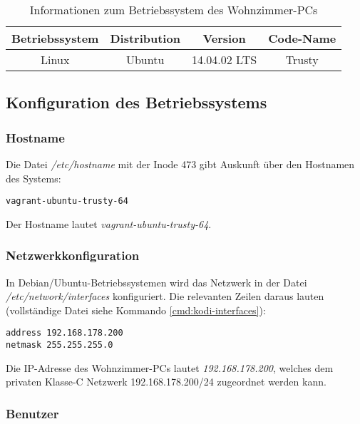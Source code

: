 \begin{table}[H]
\centering
\begin{tabular}{cccc}
\hline 
Betriebssystem & Distribution & Version & Code-Name \\ 
\hline 
Linux & Ubuntu & 14.04.02 LTS & Trusty \\ 
\hline 
\end{tabular} 
\caption{Informationen zum Betriebssystem des Wohnzimmer-PCs}
\label{table:kodi-os}
\end{table}

\subsection{Konfiguration des Betriebssystems}

\subsubsection{Hostname}
\label{sec:kodi-hostname}

Die Datei \textit{/etc/hostname} mit der Inode 473 gibt Auskunft über den Hostnamen des Systems:

\begin{cmd}
\begin{verbatim}
vagrant-ubuntu-trusty-64
\end{verbatim}
\caption{icat -o 2048 kodi.raw 473}
\end{cmd}

Der Hostname lautet \textit{vagrant-ubuntu-trusty-64}.

\subsubsection{Netzwerkkonfiguration}
\label{sec:kodi-network}

In Debian/Ubuntu-Betriebssystemen wird das Netzwerk in der Datei \textit{/etc/network/interfaces} konfiguriert. Die relevanten Zeilen daraus lauten (vollständige Datei siehe Kommando \autoref{cmd:kodi-interfaces}):

\begin{verbatim}
address 192.168.178.200
netmask 255.255.255.0
\end{verbatim}

Die IP-Adresse des Wohnzimmer-PCs lautet \textit{192.168.178.200}, welches dem privaten \mbox{Klasse-C} Netzwerk 192.168.178.200/24 zugeordnet werden kann.

\subsubsection{Benutzer}
\label{sec:kodi-users}

